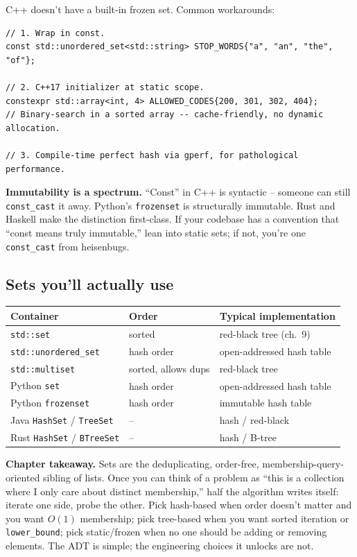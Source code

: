 \documentclass[11pt]{article}
\begin{document}
C++ doesn't have a built-in frozen set. Common workarounds:

\begin{lstlisting}[basicstyle=\ttfamily\small,frame=single]
// 1. Wrap in const.
const std::unordered_set<std::string> STOP_WORDS{"a", "an", "the", "of"};

// 2. C++17 initializer at static scope.
constexpr std::array<int, 4> ALLOWED_CODES{200, 301, 302, 404};
// Binary-search in a sorted array -- cache-friendly, no dynamic allocation.

// 3. Compile-time perfect hash via gperf, for pathological performance.
\end{lstlisting}

\begin{notebox}
\textbf{Immutability is a spectrum.} ``Const'' in C++ is syntactic -- someone can still \texttt{const\_cast} it away. Python's \texttt{frozenset} is structurally immutable. Rust and Haskell make the distinction first-class. If your codebase has a convention that ``const means truly immutable,'' lean into static sets; if not, you're one \texttt{const\_cast} from heisenbugs.
\end{notebox}

\subsection*{Sets you'll actually use}

\begin{center}
\begin{tabular}{lll}
\hline
Container & Order & Typical implementation \\
\hline
\texttt{std::set} & sorted & red-black tree (ch.\ 9) \\
\texttt{std::unordered\_set} & hash order & open-addressed hash table \\
\texttt{std::multiset} & sorted, allows dups & red-black tree \\
Python \texttt{set} & hash order & open-addressed hash table \\
Python \texttt{frozenset} & hash order & immutable hash table \\
Java \texttt{HashSet} / \texttt{TreeSet} & -- & hash / red-black \\
Rust \texttt{HashSet} / \texttt{BTreeSet} & -- & hash / B-tree \\
\hline
\end{tabular}
\end{center}

\begin{ideabox}
\textbf{Chapter takeaway.} Sets are the deduplicating, order-free, membership-query-oriented sibling of lists. Once you can think of a problem as ``this is a collection where I only care about distinct membership,'' half the algorithm writes itself: iterate one side, probe the other. Pick hash-based when order doesn't matter and you want $O(1)$ membership; pick tree-based when you want sorted iteration or \texttt{lower\_bound}; pick static/frozen when no one should be adding or removing elements. The ADT is simple; the engineering choices it unlocks are not.
\end{ideabox}
\end{document}
